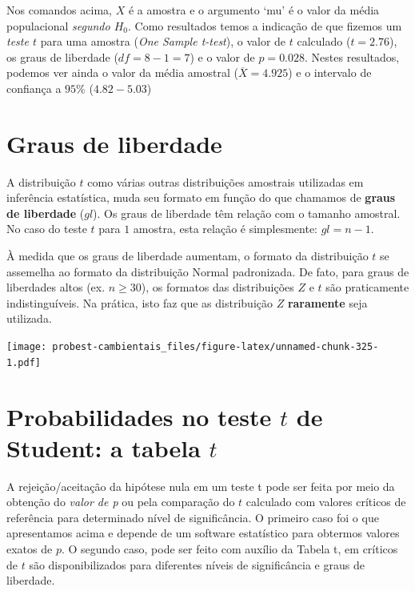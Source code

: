 \documentclass[
]{book}
\begin{document}
Nos comandos acima, \(X\) é a amostra e o argumento `mu' é o valor da média populacional \emph{segundo \(H_0\)}. Como resultados temos a indicação de que fizemos um \emph{teste \(t\)} para uma amostra (\emph{One Sample t-test}), o valor de \(t\) calculado (\(t = 2.76\)), os graus de liberdade (\(df = 8 - 1 = 7\)) e o valor de \(p = 0.028\). Nestes resultados, podemos ver ainda o valor da média amostral (\(\overline{X} = 4.925\)) e o intervalo de confiança a \(95\%\) (\(4.82 - 5.03\))

\hypertarget{graus-de-liberdade}{%
\section{Graus de liberdade}\label{graus-de-liberdade}}

A distribuição \(t\) como várias outras distribuições amostrais utilizadas em inferência estatística, muda seu formato em função do que chamamos de \textbf{graus de liberdade} (\(gl\)). Os graus de liberdade têm relação com o tamanho amostral. No caso do teste \(t\) para \(1\) amostra, esta relação é simplesmente: \(gl = n-1\).

À medida que os graus de liberdade aumentam, o formato da distribuição \(t\) se assemelha ao formato da distribuição Normal padronizada. De fato, para graus de liberdades altos (ex. \(n \ge 30\)), os formatos das distribuições \(Z\) e \(t\) são praticamente indistinguíveis. Na prática, isto faz que as distribuição \(Z\) \textbf{raramente} seja utilizada.

\texttt{[image: probest-cambientais\_files/figure-latex/unnamed-chunk-325-1.pdf]}

\hypertarget{probabilidades-no-teste-t-de-student-a-tabela-t}{%
\section{\texorpdfstring{Probabilidades no teste \(t\) de Student: a tabela \(t\)}{Probabilidades no teste t de Student: a tabela t}}\label{probabilidades-no-teste-t-de-student-a-tabela-t}}

A rejeição/aceitação da hipótese nula em um teste t pode ser feita por meio da obtenção do \emph{valor de p} ou pela comparação do \(t\) calculado com valores críticos de referência para determinado nível de significância. O primeiro caso foi o que apresentamos acima e depende de um software estatístico para obtermos valores exatos de \(p\). O segundo caso, pode ser feito com auxílio da Tabela t, em críticos de \(t\) são disponibilizados para diferentes níveis de significância e graus de liberdade.
\end{document}
